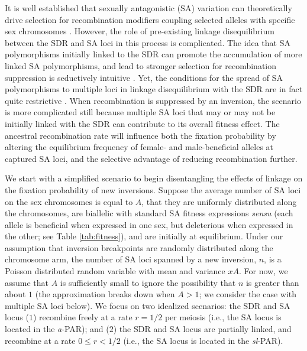 \documentclass{article}
\begin{document}
It is well established that sexually antagonistic (SA) variation can theoretically drive selection for recombination modifiers coupling selected alleles with specific sex chromosomes \cite[e.g.][]{Fisher1931,Nei1969, Charlesworth1978a, Charlesworth1980, Bull1983,Lenormand2003, Otto2019}. However, the role of pre-existing linkage disequilibrium between the SDR and SA loci in this process is complicated. The idea that SA polymorphisms initially linked to the SDR can promote the accumulation of more linked SA polymorphisms, and lead to stronger selection for recombination suppression is seductively intuitive \citep{Rice1984, Rice1996, Charlesworth2017, Otto2019}. Yet, the conditions for the spread of SA polymorphisms to multiple loci in linkage disequilibrium with the SDR are in fact quite restrictive \citep{Otto2019}. When recombination is suppressed by an inversion, the scenario is more complicated still because multiple SA loci that may or may not be initially linked with the SDR can contribute to its overall fitness effect. The ancestral recombination rate will influence both the fixation probability by altering the equilibrium frequency of female- and male-beneficial alleles at captured SA loci, and the selective advantage of reducing recombination further.

We start with a simplified scenario to begin disentangling the effects of linkage on the fixation probability of new inversions. Suppose the average number of SA loci on the sex chromosomes is equal to $A$, that they are uniformly distributed along the chromosomes, are biallelic with standard SA fitness expressions {\itshape sensu} \citet{Kidwell1977} (each allele is beneficial when expressed in one sex, but deleterious when expressed in the other; see Table \ref{tab:fitness}), and are initially at equilibrium. Under our assumption that inversion breakpoints are randomly distributed along the chromosome arm, the number of SA loci spanned by a new inversion, $n$, is a Poisson distributed random variable with mean and variance $xA$. For now, we assume that $A$ is sufficiently small to ignore the possibility that $n$ is greater than about $1$ (the approximation breaks down when $A > 1$; we consider the case with multiple SA loci below). We focus on two idealized scenarios: the SDR and SA locus ($1$) recombine freely at a rate $r = 1/2$ per meiosis (i.e., the SA locus is located in the {\itshape a}-PAR); and ($2$) the SDR and SA locus are partially linked, and recombine at a rate $0 \leq r < 1/2$ (i.e., the SA locus is located in the {\itshape sl}-PAR). 
\end{document}
